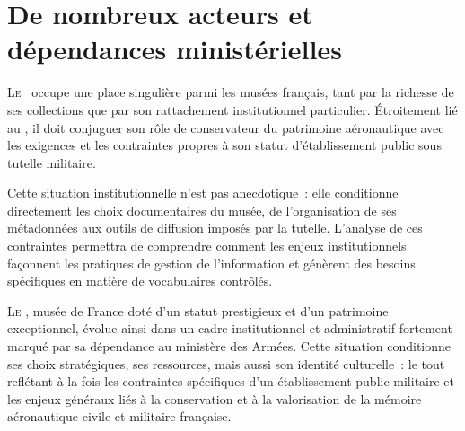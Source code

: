 \chapter[Acteurs et dépendances]{\label{I-B}De nombreux acteurs et dépendances ministérielles }


\lettrine{L}e \maelong~occupe une place singulière parmi les musées français, tant par la richesse de ses collections que par son rattachement institutionnel particulier. Étroitement lié au \minarm, il doit conjuguer son rôle de conservateur du patrimoine aéronautique avec les exigences et les contraintes propres à son statut d’établissement public sous tutelle militaire.

Cette situation institutionnelle n'est pas anecdotique~: elle conditionne directement les choix documentaires du musée, de l'organisation de ses métadonnées aux outils de diffusion imposés par la tutelle. L'analyse de ces contraintes permettra de comprendre comment les enjeux institutionnels façonnent les pratiques de gestion de l'information et génèrent des besoins spécifiques en matière de vocabulaires contrôlés.





\bigskip
\bigskip
\bigskip

\lettrine{L}{e} \maelong, musée de France doté d’un statut prestigieux et d’un patrimoine exceptionnel, évolue ainsi dans un cadre institutionnel et administratif fortement marqué par sa dépendance au ministère des Armées. Cette situation conditionne ses choix stratégiques, ses ressources, mais aussi son identité culturelle~: le tout reflétant à la fois les contraintes spécifiques d’un établissement public militaire et les enjeux généraux liés à la conservation et à la valorisation de la mémoire aéronautique civile et militaire française. 

\bigskip
\bigskip
\bigskip